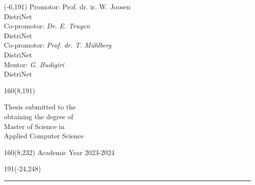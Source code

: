 %
\begin{textblock}{70}(-6,191)
\textblockcolour{}
\vspace{-\parskip}
\flushleft
Promotor: Prof. dr. ir. W. Joosen\\[-2pt]
\textcolor{blueaff}{DistriNet}\\[5pt]
Co-promotor: \textsl{Dr. E. Truyen}\\[-2pt]
\textcolor{blueaff}{DistriNet}\\[5pt]
Co-promotor: \textsl{Prof. dr. T. Mühlberg}\\[-2pt]
\textcolor{blueaff}{DistriNet}\\[5pt]
Mentor: \textsl{G. Budigiri}\\[-2pt]
\textcolor{blueaff}{DistriNet}\\
\end{textblock}
%
\begin{textblock}{160}(8,191)
\textblockcolour{}
\vspace{-\parskip}
\flushright

Thesis submitted to the\\[4.5pt]
obtaining the degree of\\[4.5pt]
Master of Science in \\[4.5pt]
Applied Computer Science\\
\end{textblock}
%
\begin{textblock}{160}(8,232)
\textblockcolour{}
\vspace{-\parskip}
\flushright
Academic Year 2023-2024
\end{textblock}
%
\begin{textblock}{191}(-24,248)
{\color{blueline}\rule{550pt}{5.5pt}}
\end{textblock}
%
\vfill
\newpage


